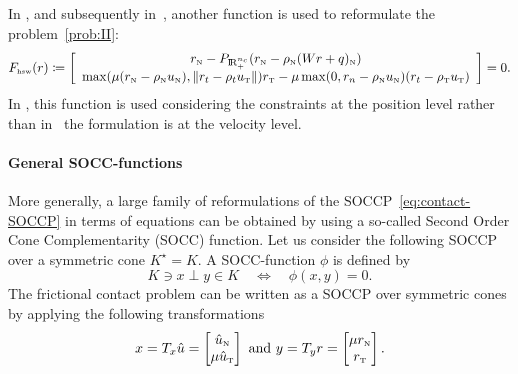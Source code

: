 {In \citep{Stadler_SIOPT2004,Hueber.ea_SJSC2008}, and subsequently in~\citep{Koziara.Bicanic_CMAME2008}, another function is used to reformulate the problem~\ref{prob:II}:
\begin{equation}
  \label{eq:HSW-II}
    F_{\hswtwo}(r) \coloneqq \left[ \begin{array}{c}
    r_\n - P_{\RR^{n_c}_+}(r_\n - \rho_\n (W r +  q)_\n) \\
    \max(\mu(r_\n-\rho_\n u_\n),\|r_t-\rho_tu_\t\|)r_\t - \mu \max(0,r_n-\rho_\n u_\n)(r_t-\rho_\t u_\t)
  \end{array}\right] =0.
\end{equation}
In \citep{Hueber.ea_SJSC2008}, this function is used considering the constraints at the position level rather than in~\citep{Koziara.Bicanic_CMAME2008} the formulation is at the velocity level.







\paragraph{General SOCC-functions}

More generally, a large family of reformulations of the SOCCP~\eqref{eq:contact-SOCCP} in terms of equations can be obtained by using a so-called Second Order Cone Complementarity (SOCC) function. Let us consider the following SOCCP over a symmetric cone $K^\star = K $. A SOCC-function $\phi$ is defined by
\begin{equation}
  \label{eq:SOCC-function}
  K \ni x \perp y \in K \quad\Longleftrightarrow\quad \phi(x,y)=0.
\end{equation}
The frictional contact problem can be written as a SOCCP over symmetric cones by applying the following transformations
\begin{equation}
  \label{eq:SOCC-function1}
  x = T_x \hat u =
  \begin{bmatrix}
    \hat u_\n \\
    \mu \hat u_{\t}
  \end{bmatrix}
  \text{ and }  y =T_y r =
  \begin{bmatrix}
    \mu r_\n \\
    r_\t
  \end{bmatrix}.
\end{equation}

}
